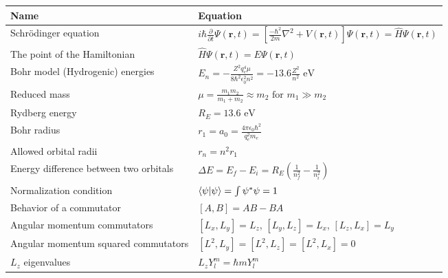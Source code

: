 \documentclass[11pt]{paper}
\begin{document}
\label{my-label}
\bgroup
\def\arraystretch{2}
\begin{longtable}{ll}
\textbf{Name}       & \textbf{Equation}          \\ \hline
\multicolumn{1}{|l|}{Schr\"{o}dinger equation} & \multicolumn{1}{l|}{$i\hbar \frac{\partial}{\partial t}\Psi\left(\mathbf{r},t\right) = \left[\frac{-\hbar^2}{2m}\nabla^2 + V\left(\mathbf{r},t\right)\right]\Psi\left(\mathbf{r},t\right) = \hat{H}\Psi\left(\mathbf{r},t\right)$} \\ \hline
\multicolumn{1}{|l|}{The point of the Hamiltonian} & \multicolumn{1}{l|}{$\hat{H}\Psi\left(\mathbf{r},t\right) = E\Psi\left(\mathbf{r},t\right)$} \\ \hline
\multicolumn{1}{|l|}{Bohr model (Hydrogenic) energies} & \multicolumn{1}{l|}{$E_n = -\frac{Z^2q_e^4 \mu}{8\hbar^2\epsilon_0^2 n^2} = -13.6\frac{Z^2}{n^2}\text{ eV}$} \\ \hline
\multicolumn{1}{|l|}{Reduced mass} & \multicolumn{1}{l|}{$\mu = \frac{m_1 m_2}{m_1+m_2}\approx m_2 \text{ for } m_1 \gg m_2$} \\ \hline
\multicolumn{1}{|l|}{Rydberg energy} & \multicolumn{1}{l|}{$R_E = 13.6\text{ eV}$} \\ \hline
\multicolumn{1}{|l|}{Bohr radius} & \multicolumn{1}{l|}{$r_1 = a_0 = \frac{4\pi\epsilon_0\hbar^2}{q_e^2m_e}$} \\ \hline
\multicolumn{1}{|l|}{Allowed orbital radii} & \multicolumn{1}{l|}{$r_n = n^2 r_1$} \\ \hline
\multicolumn{1}{|l|}{Energy difference between two orbitals} & \multicolumn{1}{l|}{$\Delta E = E_f - E_i = R_E\left(\frac{1}{n_f^2}-\frac{1}{n_i^2}\right)$} \\ \hline
\multicolumn{1}{|l|}{Normalization condition} & \multicolumn{1}{l|}{$\bra{\psi}\ket{\psi} = \int\psi^*\psi = 1$} \\ \hline
\multicolumn{1}{|l|}{Behavior of a commutator} & \multicolumn{1}{l|}{$\left[A,B\right] = AB-BA$} \\ \hline
\multicolumn{1}{|l|}{Angular momentum commutators} & \multicolumn{1}{l|}{$\left[L_x,L_y\right] = L_z$, $\left[L_y,L_z\right] = L_x$, $\left[L_z,L_x\right] = L_y$} \\ \hline
\multicolumn{1}{|l|}{Angular momentum squared commutators} & \multicolumn{1}{l|}{$\left[L^2,L_y\right] = \left[L^2,L_z\right] = \left[L^2,L_x\right] = 0$} \\ \hline
\multicolumn{1}{|l|}{$L_z$ eigenvalues} & \multicolumn{1}{l|}{$L_z Y_l^m = \hbar m Y_l^m$} \\ \hline

\end{longtable}
\end{document}
